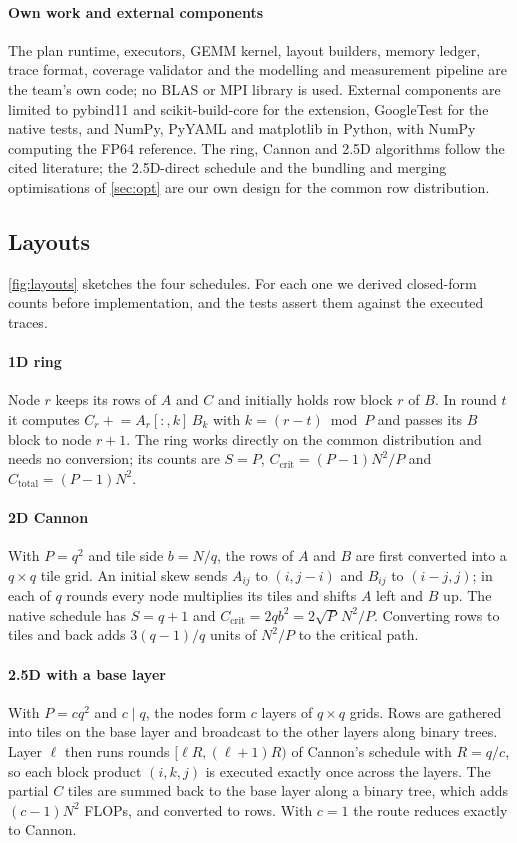 \documentclass[11pt,a4paper]{article}
\newcommand{\Ccrit}{C_{\mathrm{crit}}}
\newcommand{\Ctot}{C_{\mathrm{total}}}
\begin{document}
\paragraph{Own work and external components}
The plan runtime, executors, GEMM kernel, layout builders, memory ledger, trace format, coverage validator
and the modelling and measurement pipeline are the team's own code; no BLAS or MPI library is used.
External components are limited to pybind11 and scikit-build-core for the extension, GoogleTest for the
native tests, and NumPy, PyYAML and matplotlib in Python, with NumPy computing the FP64 reference. The
ring, Cannon and 2.5D algorithms follow the cited literature; the 2.5D-direct schedule and the bundling
and merging optimisations of \cref{sec:opt} are our own design for the common row distribution.

\subsection{Layouts}
\label{sec:layouts}

\cref{fig:layouts} sketches the four schedules. For each one we derived closed-form counts before
implementation, and the tests assert them against the executed traces.

\paragraph{1D ring}
Node $r$ keeps its rows of $A$ and $C$ and initially holds row block $r$ of $B$. In round $t$ it computes
$C_r \mathrel{+}= A_r[:,k]\,B_k$ with $k=(r-t)\bmod P$ and passes its $B$ block to node $r+1$. The ring
works directly on the common distribution and needs no conversion; its counts are $S=P$,
$\Ccrit=(P-1)N^2/P$ and $\Ctot=(P-1)N^2$.

\paragraph{2D Cannon}
With $P=q^2$ and tile side $b=N/q$, the rows of $A$ and $B$ are first converted into a $q\times q$ tile
grid. An initial skew sends $A_{ij}$ to $(i,j-i)$ and $B_{ij}$ to $(i-j,j)$; in each of $q$ rounds every
node multiplies its tiles and shifts $A$ left and $B$ up. The native schedule has $S=q+1$ and
$\Ccrit=2qb^2=2\sqrt P\,N^2/P$. Converting rows to tiles and back adds $3(q-1)/q$ units of $N^2/P$ to the
critical path.

\paragraph{2.5D with a base layer}
With $P=cq^2$ and $c\mid q$, the nodes form $c$ layers of $q\times q$ grids. Rows are gathered into tiles
on the base layer and broadcast to the other layers along binary trees. Layer $\ell$ then runs rounds
$[\ell R,(\ell+1)R)$ of Cannon's schedule with $R=q/c$, so each block product $(i,k,j)$ is executed
exactly once across the layers. The partial $C$ tiles are summed back to the base layer along a binary
tree, which adds $(c-1)N^2$ FLOPs, and converted to rows. With $c=1$ the route reduces exactly to Cannon.
\end{document}
